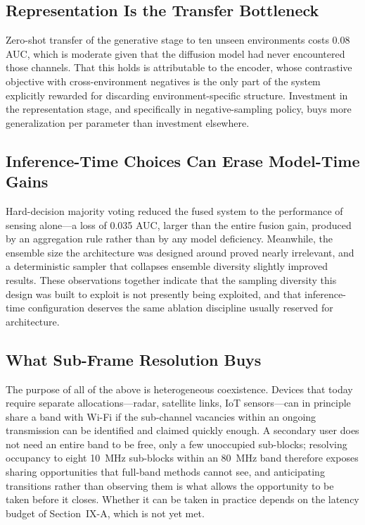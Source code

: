 \documentclass[lettersize,journal]{IEEEtran}
\begin{document}
\subsection{\textbf{Representation Is the Transfer Bottleneck}}
Zero-shot transfer of the generative stage to ten unseen environments
costs 0.08 AUC, which is moderate given that the diffusion model had
never encountered those channels. That this holds is attributable to the
encoder, whose contrastive objective with cross-environment negatives is
the only part of the system explicitly rewarded for discarding
environment-specific structure. Investment in the representation stage,
and specifically in negative-sampling policy, buys more generalization
per parameter than investment elsewhere.

\subsection{\textbf{Inference-Time Choices Can Erase Model-Time Gains}}
Hard-decision majority voting reduced the fused system to the
performance of sensing alone---a loss of 0.035 AUC, larger than the
entire fusion gain, produced by an aggregation rule rather than by any
model deficiency. Meanwhile, the ensemble size the architecture was
designed around proved nearly irrelevant, and a deterministic sampler
that collapses ensemble diversity slightly improved results. These
observations together indicate that the sampling diversity this design
was built to exploit is not presently being exploited, and that
inference-time configuration deserves the same ablation discipline
usually reserved for architecture.

\subsection{\textbf{What Sub-Frame Resolution Buys}}
The purpose of all of the above is heterogeneous coexistence. Devices that
today require separate allocations---radar, satellite links, IoT sensors---can
in principle share a band with Wi-Fi if the sub-channel vacancies within an
ongoing transmission can be identified and claimed quickly enough. A secondary
user does not need an entire band to be free, only a few unoccupied
sub-blocks; resolving occupancy to eight 10~MHz sub-blocks within an 80~MHz
band therefore exposes sharing opportunities that full-band methods cannot see,
and anticipating transitions rather than observing them is what allows the
opportunity to be taken before it closes. Whether it can be taken in practice
depends on the latency budget of Section~IX-A, which is not yet met.
\end{document}
